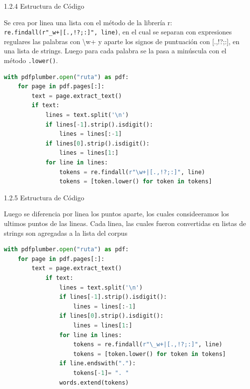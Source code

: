 \documentclass{beamer}
\begin{document}
\begin{frame}[fragile]{1.2.4 Estructura de Código}
	
	\justifying
	Se crea por linea una lista con el método de la librería r:\\
	\vspace{0.1cm}
	\texttt{re.findall(r"\_w+|[.,!?;:]", line)}, en el cual se separan con expresiones regulares las palabras con \textbackslash w+ y aparte los signos de puntuación con [.,!?;:], en una lista de strings. Luego para cada palabra se la pasa a minúscula con el método \texttt{.lower()}.
	\begin{lstlisting}[language=Python]
with pdfplumber.open("ruta") as pdf:
	for page in pdf.pages[:]:
		text = page.extract_text()
		if text:
			lines = text.split('\n')
			if lines[-1].strip().isdigit():
				lines = lines[:-1]
			if lines[0].strip().isdigit():
				lines = lines[1:]
			for line in lines:
				tokens = re.findall(r"\w+|[.,!?;:]", line)
				tokens = [token.lower() for token in tokens]
	\end{lstlisting}

\end{frame}

	
\begin{frame}[fragile]{1.2.5 Estructura de Código}
	
	\justifying
	Luego se diferencia por linea los puntos aparte, los cuales consideeramos los ultimos puntos de las lineas. Cada linea, las cuales fueron convertidas en listas de strings son agregadas a la lista del corpus\\

	\begin{lstlisting}[language=Python]
with pdfplumber.open("ruta") as pdf:
	for page in pdf.pages[:]:
		text = page.extract_text()
			if text:
				lines = text.split('\n')
				if lines[-1].strip().isdigit():
					lines = lines[:-1]
				if lines[0].strip().isdigit():
					lines = lines[1:]
				for line in lines:
					tokens = re.findall(r"\_w+|[.,!?;:]", line)
					tokens = [token.lower() for token in tokens]
				if line.endswith("."):
					tokens[-1]= ". "
				words.extend(tokens)
	\end{lstlisting}
	
	
	
	
	
\end{frame}
	
\end{document}
